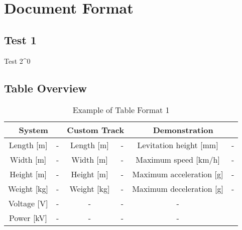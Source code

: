 \section{Document Format}

\subsection{Test 1}
Test 2^0


\subsection{Table Overview }


\begin{table}[H]
    \centering
    \begin{tabular}{|c|c|c|c|c|c|}
    \hline
         \multicolumn{2}{|c|}{\textcolor{ehwBlue}{\textbf{System}}} & \multicolumn{2}{c|}{\textcolor{ehwBlue}{\textbf{Custom Track}}} & \multicolumn{2}{c|}{\textcolor{ehwBlue}{\textbf{Demonstration}}} \\ \hline
         Length [m] & - & Length [m] & - & Levitation height [mm] & - \\\hline
         Width [m] & - & Width [m] & - & Maximum speed [km/h] & - \\\hline
         Height [m] & - & Height [m] & - & Maximum acceleration [g] & - \\\hline
         Weight [kg] & - & Weight [kg] & - & Maximum deceleration [g] & - \\\hline
         Voltage [V] & - & - & - & - & \\\hline
         Power [kV] & -  & - & - & - & \\\hline
    \end{tabular}
    \caption{Example of Table Format 1}
    \label{tab:Tab1}
\end{table}

